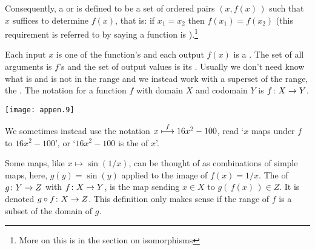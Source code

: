 Consequently, a  
or  is defined
to be a set of ordered pairs \( (x,f(x)\,) \)
such that \( x \) suffices to determine \( f(x) \), that is:
if \( x_1=x_2 \) then \( f(x_1)=f(x_2) \)
(this requirement is referred to by saying a
function is %
).\footnote{More on this is in the section
on isomorphisms}

Each input \( x \) is one of the function's 
 and each
output \( f(x) \) is a .
The set of all arguments is \( f \)'s 
and the set of output values is its 
.
Usually we don't need know what is and is not in the range and we instead
work with a superset of the range, the
.
The notation for a function \( f \) with domain \( X \) and codomain \( Y \) is
\( \mbox{$f\colon X\to Y$} \).
\begin{center}
  \texttt{[image: appen.9]}
%
%
%
\end{center}
We sometimes instead use the notation \( x\stackrel{f}{\longmapsto} 16x^2-100 \), read
`\( x \) maps under \( f \) to \( 16x^2-100 \)', or
`\( 16x^2-100 \) is the  
of \( x \)'.

Some maps, like \( x\mapsto \sin(1/x) \), can be thought of as
combinations of simple maps, here, 
\( g(y)=\sin(y) \) applied to the image of \( f(x)=1/x \).
The  
of \( \mbox{$g\colon Y\to Z$} \) with \( \mbox{$f\colon X\to Y$} \),
is the map sending
\( x\in X \) to \( g(\, f(x)\,)\in Z \).
It is denoted \( \mbox{$g\mathbin\circ f\colon X\to Z$} \).
This definition only makes sense if the range of \( f \) is a
subset of the domain of \( g \).

